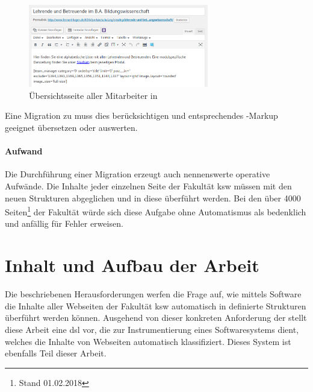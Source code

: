         \begin{figure}[htb]
            \centering
            \includegraphics[width=0.7\textwidth]{../resources/wordpress/teachers-overview.png}
            \caption{Übersichtsseite aller Mitarbeiter in {\wordpress}}
            \label{image:introductionFernUniWordpressOverviewForm}
        \end{figure}

        Eine Migration zu {\imperia} muss dies berücksichtigen und entsprechendes {\wordpress}-Markup
        geeignet übersetzen oder auswerten.

        \paragraph{Aufwand}
        Die Durchführung einer Migration erzeugt auch nennenswerte operative Aufwände.
        Die Inhalte jeder einzelnen Seite der Fakultät \gls{ksw} müssen
        mit den neuen Strukturen abgeglichen und in diese überführt werden.
        Bei den über 4000 Seiten\footnote{Stand 01.02.2018} der Fakultät
        würde sich diese Aufgabe ohne Automatismus als bedenklich und anfällig für Fehler erweisen.

    \section{Inhalt und Aufbau der Arbeit}
        Die beschriebenen Herausforderungen
        werfen die Frage auf, wie mittels Software die Inhalte aller Webseiten der Fakultät \gls{ksw}
        automatisch in definierte Strukturen überführt werden können.
        Ausgehend von dieser konkreten Anforderung der {\fernUni} stellt diese Arbeit eine
        \gls{dsl} vor, die zur Instrumentierung eines Softwaresystems dient,
        welches die Inhalte von Webseiten automatisch klassifiziert.
        Dieses System ist ebenfalls Teil dieser Arbeit.

